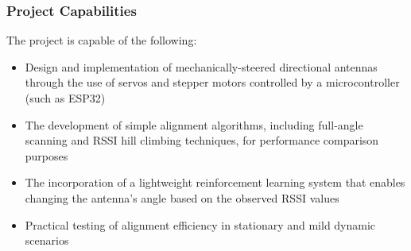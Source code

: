 \subsubsection{Project Capabilities}

The project is capable of the following:
\begin{itemize}
    \item Design and implementation of mechanically-steered directional antennas through the use of servos and stepper motors controlled by a microcontroller (such as ESP32)
    \item The development of simple alignment algorithms, including full-angle scanning and RSSI hill climbing techniques, for performance comparison purposes
    \item The incorporation of a lightweight reinforcement learning system that enables changing the antenna’s angle based on the observed RSSI values
    \item Practical testing of alignment efficiency in stationary and mild dynamic scenarios
\end{itemize}
